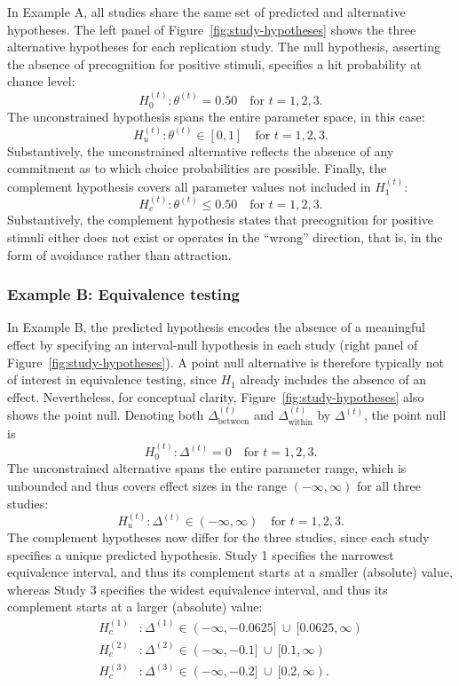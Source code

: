 \documentclass[letterpaper,11pt,oneside]{article}
\begin{document}
In Example A, all studies share the same set of predicted and alternative hypotheses. The left panel of Figure~\ref{fig:study-hypotheses} shows the three alternative hypotheses for each replication study. The null hypothesis, asserting the absence of precognition for positive stimuli, specifies a hit probability at chance level:
    \[
    H_{0}^{(t)}: \theta^{(t)} = 0.50 \quad \text{for } t = 1,2,3.
    \]
The unconstrained hypothesis spans the entire parameter space, in this case:
    \[
    H_{u}^{(t)}: \theta^{(t)} \in [0,1] \quad \text{for } t = 1,2,3.
    \]
Substantively, the unconstrained alternative reflects the absence of any commitment as to which choice probabilities are possible. Finally, the complement hypothesis covers all parameter values not included in $H_1^{(t)}$:
    \[
    H_{c}^{(t)}: \theta^{(t)} \leq 0.50\quad \text{for } t = 1,2,3.
    \]
Substantively, the complement hypothesis states that precognition for positive stimuli either does not exist or operates in the ``wrong'' direction, that is, in the form of avoidance rather than attraction.

\subsubsection{Example B: Equivalence testing}

In Example B, the predicted hypothesis encodes the absence of a meaningful effect by specifying an interval-null hypothesis in each study (right panel of Figure~\ref{fig:study-hypotheses}). A point null alternative is therefore typically not of interest in equivalence testing, since $H_1$ already includes the absence of an effect. Nevertheless, for conceptual clarity, Figure~\ref{fig:study-hypotheses} also shows the point null. Denoting both $\Delta_{\text{between}}^{(t)}$ and $\Delta_{\text{within}}^{(t)}$ by $\Delta^{(t)}$, the point null is
    \[
    H_{0}^{(t)}: \Delta^{(t)} = 0 \quad \text{for } t = 1,2,3.
    \]
The unconstrained alternative spans the entire parameter range, which is unbounded and thus covers effect sizes in the range $(-\infty,\infty)$ for all three studies: %
    \[
    H_{u}^{(t)}: \Delta^{(t)} \in (-\infty,\infty) \quad \text{for } t = 1,2,3.
    \]
The complement hypotheses now differ for the three studies, since each study specifies a unique predicted hypothesis. Study 1 specifies the narrowest equivalence interval, and thus its complement starts at a smaller (absolute) value, whereas Study 3 specifies the widest equivalence interval, and thus its complement starts at a larger (absolute) value:
    \[
    \begin{aligned}
    H_{c}^{(1)} &: \Delta^{(1)} \in (-\infty, -0.0625]\ \cup\ [0.0625, \infty) \\
    H_{c}^{(2)} &: \Delta^{(2)} \in (-\infty, -0.1]\ \cup\ [0.1, \infty) \\
    H_{c}^{(3)} &: \Delta^{(3)} \in (-\infty, -0.2]\ \cup\ [0.2, \infty).
    \end{aligned}
    \]
\end{document}
